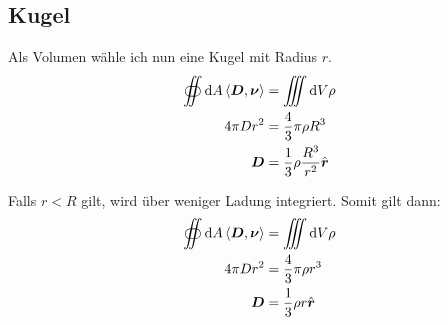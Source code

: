 \documentclass[11pt, ngerman]{article}
\newcommand{\inner}[2]{\left\langle #1, #2 \right\rangle}
\renewcommand{\vec}[1]{\boldsymbol{#1}}
\begin{document}
\subsection{Kugel}

Als Volumen wähle ich nun eine Kugel mit Radius $r$.
%
\begin{align*}
	\oiint \dif A \inner{\vec D}{\vec \nu} &= \iiint \dif V \rho \\
	4 \pi D r^2 &= \frac 43 \pi \rho R^3 \\
						\vec D &= \frac 13 \rho \frac{R^3}{r^2} \hat{\vec r}
\end{align*}

Falls $r < R$ gilt, wird über weniger Ladung integriert. Somit gilt dann:
%
\begin{align*}
	\oiint \dif A \inner{\vec D}{\vec \nu} &= \iiint \dif V \rho \\
	4 \pi D r^2 &= \frac 43 \pi \rho r^3 \\
						\vec D &= \frac 13 \rho r \hat{\vec r}
\end{align*}
\end{document}
